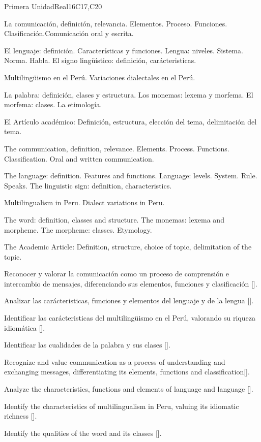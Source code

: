 \begin{syllabus}
\begin{unit}{}{Primera Unidad}{Real}{16}{C17,C20}
\begin{topics}
      \item La comunicación, definición, relevancia. Elementos. Proceso. Funciones. Clasificación.Comunicación oral y escrita.
      \item El lenguaje: definición. Características y funciones. Lengua: niveles. Sistema. Norma. Habla. El signo lingüístico: definición, carácteristicas.
      \item Multilingüismo en el Perú. Variaciones dialectales en el Perú.
      \item La palabra: definición, clases y estructura. Los monemas: lexema y morfema. El morfema: clases. La etimología.
      \item El Artículo académico: Definición, estructura, elección del tema, delimitación del tema.

      \item The communication, definition, relevance. Elements. Process. Functions. Classification. Oral and written communication.
      \item The language: definition. Features and functions. Language: levels. System. Rule. Speaks. The linguistic sign: definition, characteristics.
      \item Multilingualism in Peru. Dialect variations in Peru.
      \item The word: definition, classes and structure. The monemas: lexema and morpheme. The morpheme: classes. Etymology.
      \item The Academic Article: Definition, structure, choice of topic, delimitation of the topic.
\end{topics}

\begin{learningoutcomes}
   \item Reconocer y valorar la comunicación como un proceso de comprensión e intercambio de mensajes, diferenciando sus elementos, funciones y clasificación [\Usage].
   \item Analizar las carácteristicas, funciones y elementos del lenguaje y de la lengua [\Usage].
   \item Identificar las carácteristicas del multilingüismo en el Perú, valorando su riqueza idiomática [\Usage].
   \item Identificar las cualidades de la palabra y sus clases [\Usage].

   \item Recognize and value communication as a process of understanding and exchanging messages, differentiating its elements, functions and classification[\Usage].
   \item Analyze the characteristics, functions and elements of language and language [\Usage].
   \item Identify the characteristics of multilingualism in Peru, valuing its idiomatic richness [\Usage].
   \item Identify the qualities of the word and its classes [\Usage].
\end{learningoutcomes}
\end{unit}


\end{syllabus}
